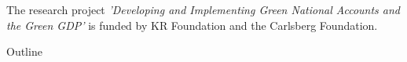 

    \newcommand{\inline}[1]{}  %




\begin{frame}
    \maketitle
    \footnotesize
    The research project \textit{’Developing and Implementing Green National Accounts and the Green GDP’} is funded by KR Foundation and the Carlsberg Foundation.
\end{frame}




\begin{frame}{Outline}
    \tableofcontents
\end{frame}





